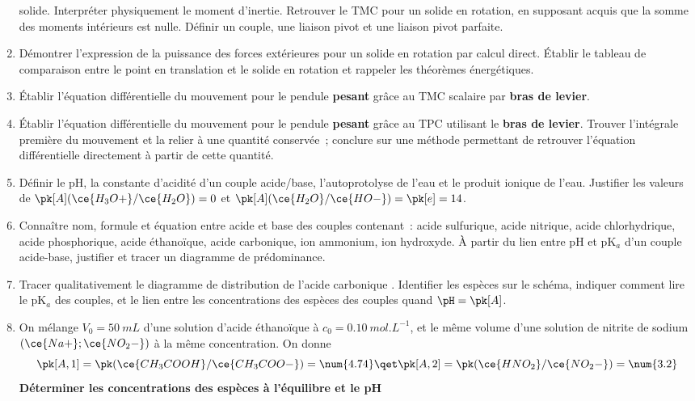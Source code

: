 \documentclass[a4paper, 12pt, final, garamond]{book}
\begin{document}
\begin{enumerate}[label=\sqenumi]
	      solide. Interpréter physiquement le moment d'inertie.
	      Retrouver le TMC pour un solide en rotation, en supposant acquis
	      que la somme des moments intérieurs est nulle. Définir un couple, une
	      liaison pivot et une liaison pivot parfaite.
	\item Démontrer l'expression de la puissance des forces extérieures pour un
	      solide en rotation par calcul direct. Établir le tableau de comparaison
	      entre le point en translation et le solide en rotation et rappeler les
	      théorèmes énergétiques.
	\item Établir l'équation différentielle du mouvement pour le pendule
	      \textbf{pesant} grâce au TMC scalaire par \textbf{bras de levier}.
	\item Établir l'équation différentielle du mouvement pour le pendule
	      \textbf{pesant} grâce au TPC utilisant le \textbf{bras de levier}.
	      Trouver l'intégrale première du mouvement et la relier à une quantité
	      conservée~; conclure sur une méthode permettant de retrouver l'équation
	      différentielle directement à partir de cette quantité.

	\item Définir le pH, la constante d'acidité d'un couple acide/base,
	      l'autoprotolyse de l'eau et le produit ionique de l'eau. Justifier les
	      valeurs de $\pk[A](\ce{H_3O+}/\ce{H_2O}) = 0$ et
	      $\pk[A](\ce{H_2O}/\ce{HO-}) = \pk[e] = 14$.
	\item Connaître nom, formule et équation entre acide et base des couples
	      contenant~: acide sulfurique, acide nitrique, acide chlorhydrique, acide
	      phosphorique, acide éthanoïque, acide carbonique, ion ammonium, ion
	      hydroxyde. À partir du lien entre pH et pK$_a$ d'un couple acide-base,
	      justifier et tracer un diagramme de prédominance.
	\item Tracer qualitativement le diagramme de distribution de l'acide
	      carbonique . Identifier les espèces sur le schéma, indiquer
	      comment lire le pK$_a$ des couples, et le lien entre les concentrations
	      des espèces des couples quand $\pH = \pk[A]$.
	\item On mélange $V_0 = \SI{50}{mL}$ d'une solution d'acide éthanoïque à $c_0
		      = \SI{0.10}{mol.L^{-1}}$, et le même volume d'une solution de nitrite de
	      sodium $\left( \ce{Na+};\ce{NO_2-} \right)$ à la même concentration. On
	      donne
	      \[
		      \pk[A,1] = \pk(\ce{CH_3COOH}/\ce{CH_3COO-}) = \num{4.74}
		      \qet
		      \pk[A,2] = \pk(\ce{HNO_2}/\ce{NO_2-}) = \num{3.2}
	      \]
	      \textbf{Déterminer les concentrations des espèces à l'équilibre et le
		      pH}
\end{enumerate}
\end{document}
